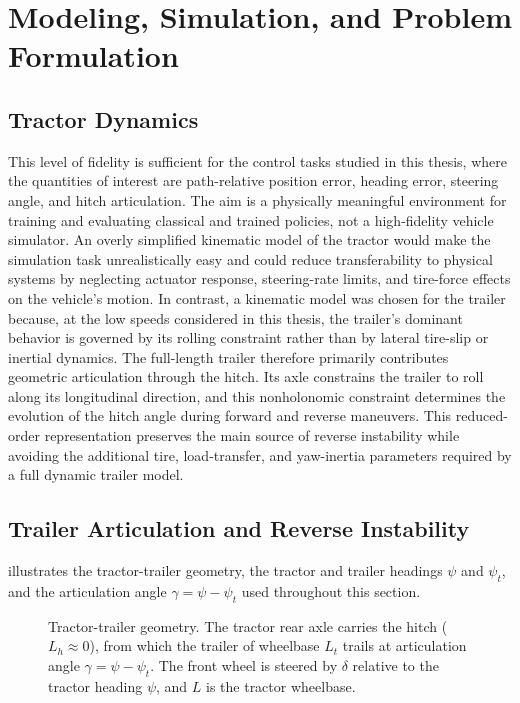 \chapter{Modeling, Simulation, and Problem Formulation}
\label{ch:modeling_simulation_problem}
\label{ch:modeling}

\section{Tractor Dynamics}
\label{sec:tractor_dynamics}



This level of fidelity is sufficient for the control tasks studied in this thesis, where the quantities of interest are path-relative position error, heading error, steering angle, and hitch articulation. The aim is a physically meaningful environment for training and evaluating classical and trained policies, not a high-fidelity vehicle simulator. An overly simplified kinematic model of the tractor would make the simulation task unrealistically easy and could reduce transferability to physical systems by neglecting actuator response, steering-rate limits, and tire-force effects on the vehicle's motion. In contrast, a kinematic model was chosen for the trailer because, at the low speeds considered in this thesis, the trailer's dominant behavior is governed by its rolling constraint rather than by lateral tire-slip or inertial dynamics. The full-length trailer therefore primarily contributes geometric articulation through the hitch. Its axle constrains the trailer to roll along its longitudinal direction, and this nonholonomic constraint determines the evolution of the hitch angle during forward and reverse maneuvers. This reduced-order representation preserves the main source of reverse instability while avoiding the additional tire, load-transfer, and yaw-inertia parameters required by a full dynamic trailer model.

\section{Trailer Articulation and Reverse Instability}

 illustrates the tractor-trailer geometry, the tractor and trailer headings $\psi$ and $\psi_t$, and the articulation angle $\gamma = \psi - \psi_t$ used throughout this section.

\begin{figure}[t]
  \centering
  
  \caption{Tractor-trailer geometry. The tractor rear axle carries the hitch ($L_h \approx 0$), from which the trailer of wheelbase $L_t$ trails at articulation angle $\gamma = \psi - \psi_t$. The front wheel is steered by $\delta$ relative to the tractor heading $\psi$, and $L$ is the tractor wheelbase.}
  \label{fig:tractor_trailer_geometry}
\end{figure}

